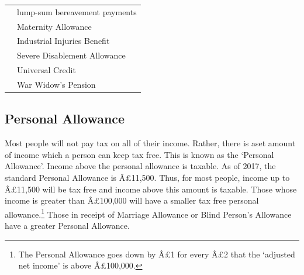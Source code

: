 \documentclass[]{tufte-handout}
\begin{document}
\begin{longtable}[]{@{}ll@{}}
\begin{minipage}[t]{0.47\columnwidth}\raggedright
\strut
\end{minipage} & \begin{minipage}[t]{0.47\columnwidth}\raggedright
lump-sum bereavement payments\strut
\end{minipage}\tabularnewline
\begin{minipage}[t]{0.47\columnwidth}\raggedright
\strut
\end{minipage} & \begin{minipage}[t]{0.47\columnwidth}\raggedright
Maternity Allowance\strut
\end{minipage}\tabularnewline
\begin{minipage}[t]{0.47\columnwidth}\raggedright
\strut
\end{minipage} & \begin{minipage}[t]{0.47\columnwidth}\raggedright
Industrial Injuries Benefit\strut
\end{minipage}\tabularnewline
\begin{minipage}[t]{0.47\columnwidth}\raggedright
\strut
\end{minipage} & \begin{minipage}[t]{0.47\columnwidth}\raggedright
Severe Disablement Allowance\strut
\end{minipage}\tabularnewline
\begin{minipage}[t]{0.47\columnwidth}\raggedright
\strut
\end{minipage} & \begin{minipage}[t]{0.47\columnwidth}\raggedright
Universal Credit\strut
\end{minipage}\tabularnewline
\begin{minipage}[t]{0.47\columnwidth}\raggedright
\strut
\end{minipage} & \begin{minipage}[t]{0.47\columnwidth}\raggedright
War Widow's Pension\strut
\end{minipage}\tabularnewline
\bottomrule
\end{longtable}

\hypertarget{personal-allowance}{%
\subsection{Personal Allowance}\label{personal-allowance}}

Most people will not pay tax on all of their income. Rather, there is
aset amount of income which a person can keep tax free. This is known as
the `Personal Allowance'. Income above the personal allowance is
taxable. As of 2017, the standard Personal Allowance is Â£11,500. Thus,
for most people, income up to Â£11,500 will be tax free and income above
this amount is taxable. Those whose income is greater than Â£100,000
will have a smaller tax free personal allowance.\footnote{The Personal
  Allowance goes down by Â£1 for every Â£2 that the `adjusted net
  income' is above Â£100,000.} Those in receipt of Marriage Allowance or
Blind Person's Allowance have a greater Personal Allowance.
\end{document}
